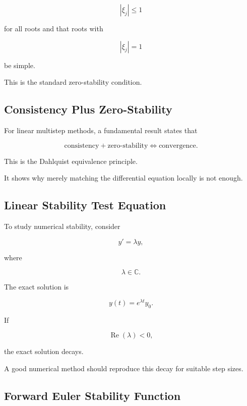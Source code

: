 \[
\boxed{
|\xi_j|\leq1
}
\]

for all roots and that roots with

\[
|\xi_j|=1
\]

be simple.

This is the standard zero-stability condition.

\subsection{Consistency Plus Zero-Stability}
\label{subsec:dahlquist-equivalence-preview}

For linear multistep methods, a fundamental result states that

\[
\boxed{
\text{consistency}
+
\text{zero-stability}
\Longleftrightarrow
\text{convergence}.
}
\]

This is the Dahlquist equivalence principle.

It shows why merely matching the differential equation locally is not
enough.

\subsection{Linear Stability Test Equation}
\label{subsec:ode-test-equation}

To study numerical stability, consider

\[
\boxed{
y'
=
\lambda y,
}
\]

where

\[
\lambda\in\mathbb{C}.
\]

The exact solution is

\[
\boxed{
y(t)
=
e^{\lambda t}y_0.
}
\]

If

\[
\operatorname{Re}(\lambda)<0,
\]

the exact solution decays.

A good numerical method should reproduce this decay for suitable step
sizes.

\subsection{Forward Euler Stability Function}
\label{subsec:forward-euler-stability}

